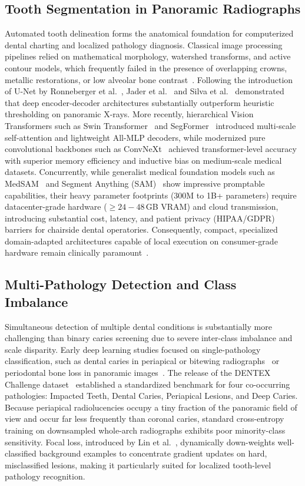 \documentclass[review]{elsarticle}
\begin{document}
\subsection{Tooth Segmentation in Panoramic Radiographs}
Automated tooth delineation forms the anatomical foundation for computerized dental charting and localized pathology diagnosis. Classical image processing pipelines relied on mathematical morphology, watershed transforms, and active contour models, which frequently failed in the presence of overlapping crowns, metallic restorations, or low alveolar bone contrast~\cite{nomir2005human}. Following the introduction of U-Net by Ronneberger et al.~\cite{ronneberger2015unet}, Jader et al.~\cite{jader2018deep} and Silva et al.~\cite{silva2021automatic} demonstrated that deep encoder-decoder architectures substantially outperform heuristic thresholding on panoramic X-rays. More recently, hierarchical Vision Transformers such as Swin Transformer~\cite{liu2021swin} and SegFormer~\cite{xie2021segformer} introduced multi-scale self-attention and lightweight All-MLP decoders, while modernized pure convolutional backbones such as ConvNeXt~\cite{liu2022convnext} achieved transformer-level accuracy with superior memory efficiency and inductive bias on medium-scale medical datasets. Concurrently, while generalist medical foundation models such as MedSAM~\cite{ma2024segment} and Segment Anything (SAM)~\cite{kirillov2023segment} show impressive promptable capabilities, their heavy parameter footprints (300M to 1B+ parameters) require datacenter-grade hardware ($\ge 24-48$\,GB VRAM) and cloud transmission, introducing substantial cost, latency, and patient privacy (HIPAA/GDPR) barriers for chairside dental operatories. Consequently, compact, specialized domain-adapted architectures capable of local execution on consumer-grade hardware remain clinically paramount~\cite{schwendicke2019convolutional}.

\subsection{Multi-Pathology Detection and Class Imbalance}
Simultaneous detection of multiple dental conditions is substantially more challenging than binary caries screening due to severe inter-class imbalance and scale disparity. Early deep learning studies focused on single-pathology classification, such as dental caries in periapical or bitewing radiographs~\cite{lee2018caries, casalegno2019caries} or periodontal bone loss in panoramic images~\cite{krois2019deep}. The release of the DENTEX Challenge dataset~\cite{hamamci2023dentex} established a standardized benchmark for four co-occurring pathologies: Impacted Teeth, Dental Caries, Periapical Lesions, and Deep Caries. Because periapical radiolucencies occupy a tiny fraction of the panoramic field of view and occur far less frequently than coronal caries, standard cross-entropy training on downsampled whole-arch radiographs exhibits poor minority-class sensitivity. Focal loss, introduced by Lin et al.~\cite{lin2017focal}, dynamically down-weights well-classified background examples to concentrate gradient updates on hard, misclassified lesions, making it particularly suited for localized tooth-level pathology recognition.
\end{document}
